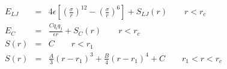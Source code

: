 


\begin{eqnarray*}
E_{LJ} & = & 4 \epsilon \left[ \left(\frac{\sigma}{r}\right)^{12} - 
                       \left(\frac{\sigma}{r}\right)^6 \right] + S_{LJ}(r)
                       \qquad r < r_c \\
E_C & = & \frac{C q_i q_j}{\epsilon  r} + S_C(r) \qquad r < r_c \\
S(r) & = & C \qquad r < r_1 \\
S(r) & = & \frac{A}{3} (r - r_1)^3 + \frac{B}{4} (r - r_1)^4 + C \qquad  r_1 < r < r_c
\end{eqnarray*}                           


